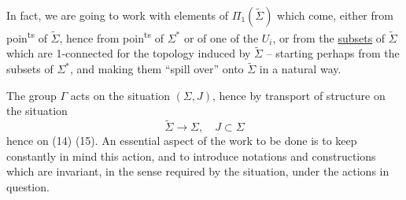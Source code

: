 In fact, we are going to work with elements of $\Pi_1(\widetilde\Sigma)$ which come, either from poin\textsuperscript{ts} of $\widetilde\Sigma$, hence from poin\textsuperscript{ts} of $\Sigma^*$ or of one of the $U_i$, or from the \uline{subsets} of $\widetilde\Sigma$ which are 1-connected for the topology induced by $\widetilde\Sigma$ -- starting perhaps from the  subsets of $\Sigma^*$, and making them ``spill over'' onto $\widetilde\Sigma$ in a natural way.

The group $\Gamma$ acts on the  situation $(\Sigma,J)$, hence by transport of structure on the situation
\[
\widetilde\Sigma\longrightarrow\Sigma,\quad J\subset\Sigma
\]
hence on  (14) (15). An essential aspect of the work to be done is to keep  constantly in mind this action, and to introduce notations and constructions which are invariant, in the sense required by the situation, under the actions in question.

